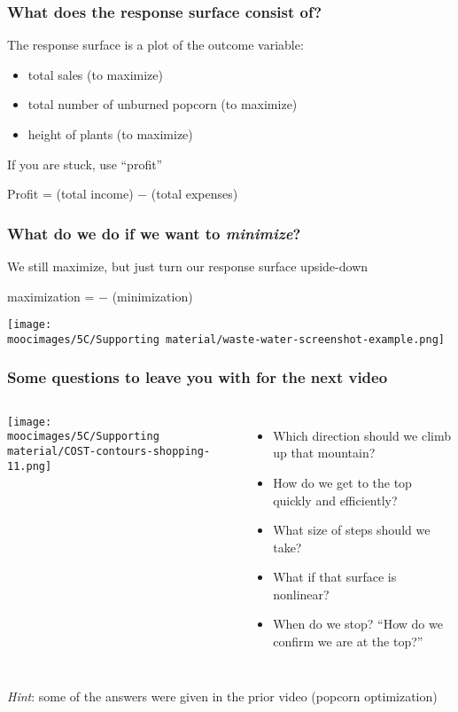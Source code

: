 \documentclass[handout,11pt,aspectratio=169,mathserif]{beamer}
\begin{document}
\begin{frame}\frametitle{What does the response surface consist of?}
	
	The response surface is a plot of the outcome variable:
	\begin{itemize}
		\item	total sales (to maximize)
		\item	total number of unburned popcorn (to maximize)
		\item	height of plants (to maximize)
	\end{itemize}
	\vspace{1cm}
	If you are stuck, use ``profit''
	\begin{exampleblock}{}
		\centerline{\color{myGreen}Profit = (total income) $-$ (total expenses)}
	\end{exampleblock}
	
\end{frame}

\begin{frame}\frametitle{What do we do if we want to \emph{\textbf{minimize}}?}
	
	We still maximize, but just turn our response surface upside-down
	
	\vspace{.5cm}
	\begin{exampleblock}{}
		\centerline{\color{myGreen}maximization = $-$ (minimization)}
	\end{exampleblock}
	\centerline{\texttt{[image: \\moocimages/5C/Supporting material/waste-water-screenshot-example.png]}}
	
\end{frame}

\begin{frame}\frametitle{Some questions to leave you with for the next video }
	\begin{columns}[c]
			\centerline{\texttt{[image: \\moocimages/5C/Supporting material/COST-contours-shopping-11.png]}}

			\begin{itemize}
				\item	Which direction should we climb up that mountain? 
				\item	How do we get to the top quickly and efficiently? \pause
				\item	What size of steps should we take? \pause
				\item	What if that surface is nonlinear? \pause
				\item	When do we stop? ``How do we confirm we are at the top?''
			\end{itemize}
	\end{columns}
	 
	\pause
	\vspace{1cm}
	{\color{myOrange}\emph{Hint}: some of the answers were given in the prior video (popcorn optimization)}
\end{frame}
\end{document}
